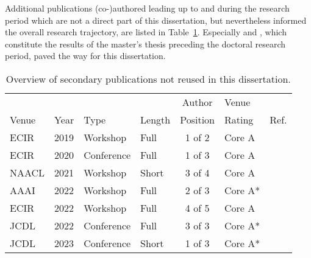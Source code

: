Additional publications (co-)authored leading up to and during the research period which are not a direct part of this dissertation, but nevertheless informed the overall research trajectory, are listed in Table~\ref{tab:secondarypublicationoverview}. Especially \cite{Saier2019} and \cite{Krause2021}, which constitute the results of the master's thesis preceding the doctoral research period, paved the way for this dissertation.

\begin{table}[h]
\centering
  \caption{Overview of secondary publications not reused in this dissertation.}
  \label{tab:secondarypublicationoverview}
  \begin{tabular}{llllclr}
    \hline
    \ & \ & \ & \ & Author & Venue & \ \\
    Venue & Year & Type & Length & Position & Rating & Ref. \\
    \hline
    ECIR & 2019 & Workshop & Full & 1 of 2 & Core A & \cite{Saier2019} \\
    ECIR & 2020 & Conference & Full & 1 of 3 & Core A & \cite{Saier2020a} \\
    NAACL & 2021 & Workshop & Short & 3 of 4 & Core A & \cite{Krause2021} \\
    AAAI & 2022 & Workshop & Full & 2 of 3 & Core A* & \cite{Shapiro2022} \\
    ECIR & 2022 & Workshop & Full & 4 of 5 & Core A & \cite{Faerber2022bir} \\
    JCDL & 2022 & Conference & Full & 3 of 3 & Core A* & \cite{Nishioka2022} \\
    JCDL & 2023 & Conference & Short & 1 of 3 & Core A* & \cite{Saier2023cocon} \\
    \hline
    \end{tabular}
\end{table}
